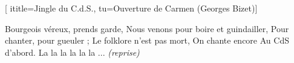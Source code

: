  [
ititle={Jingle du C.d.S.}, 
tu={Ouverture de Carmen (Georges Bizet)}]

\beginverse
Bourgeois véreux, prends garde,
Nous venons pour boire et guindailler,
Pour chanter, pour gueuler ;
Le folklore n'est pas mort,
On chante encore
Au CdS d'abord.
La la la la la la ... \textit{(reprise)}
\endverse
\endsong